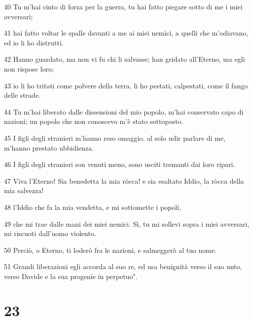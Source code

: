 \par 40 Tu m'hai cinto di forza per la guerra, tu hai fatto piegare sotto di me i miei avversari;
\par 41 hai fatto voltar le spalle davanti a me ai miei nemici, a quelli che m'odiavano, ed io li ho distrutti.
\par 42 Hanno guardato, ma non vi fu chi li salvasse; han gridato all'Eterno, ma egli non rispose loro;
\par 43 io li ho tritati come polvere della terra, li ho pestati, calpestati, come il fango delle strade.
\par 44 Tu m'hai liberato dalle dissensioni del mio popolo, m'hai conservato capo di nazioni; un popolo che non conoscevo m'è stato sottoposto.
\par 45 I figli degli stranieri m'hanno reso omaggio, al solo udir parlare di me, m'hanno prestato ubbidienza.
\par 46 I figli degli stranieri son venuti meno, sono usciti tremanti dai loro ripari.
\par 47 Viva l'Eterno! Sia benedetta la mia ròcca! e sia esaltato Iddio, la ròcca della mia salvezza!
\par 48 l'Iddio che fa la mia vendetta, e mi sottomette i popoli,
\par 49 che mi trae dalle mani dei miei nemici. Sì, tu mi sollevi sopra i miei avversari, mi riscuoti dall'uomo violento.
\par 50 Perciò, o Eterno, ti loderò fra le nazioni, e salmeggerò al tuo nome.
\par 51 Grandi liberazioni egli accorda al suo re, ed usa benignità verso il suo unto, verso Davide e la sua progenie in perpetuo".

\chapter{23}

